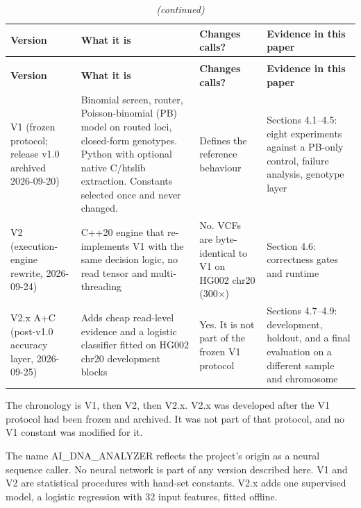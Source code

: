 \documentclass[11pt,a4paper]{article}
\begin{document}
{\footnotesize
\setlength{\tabcolsep}{3.2pt}
\begin{xltabular}{\linewidth}{>{\hsize\raggedright\arraybackslash}X>{\hsize\raggedright\arraybackslash}X>{\hsize\raggedright\arraybackslash}X>{\hsize\raggedright\arraybackslash}X}
\caption{Versions of AI\_DNA\_ANALYZER and the evidence used for each.}\\
\toprule
\textbf{Version} & \textbf{What it is} & \textbf{Changes calls?} & \textbf{Evidence in this paper} \\
\midrule
\endfirsthead
\caption[]{\textit{(continued)}}\\
\toprule
\textbf{Version} & \textbf{What it is} & \textbf{Changes calls?} & \textbf{Evidence in this paper} \\
\midrule
\endhead
V1 (frozen protocol; release v1.0 archived 2026-09-20) & Binomial screen, router, Poisson-binomial (PB) model on routed loci, closed-form genotypes. Python with optional native C/htslib extraction. Constants selected once and never changed. & Defines the reference behaviour & Sections 4.1--4.5: eight experiments against a PB-only control, failure analysis, genotype layer \\
V2 (execution-engine rewrite, 2026-09-24) & C++20 engine that re-implements V1 with the same decision logic, no read tensor and multi-threading & No. VCFs are byte-identical to V1 on HG002 chr20 (300$\times$) & Section 4.6: correctness gates and runtime \\
V2.x A+C (post-v1.0 accuracy layer, 2026-09-25) & Adds cheap read-level evidence and a logistic classifier fitted on HG002 chr20 development blocks & Yes. It is not part of the frozen V1 protocol & Sections 4.7--4.9: development, holdout, and a final evaluation on a different sample and chromosome \\
\bottomrule
\end{xltabular}
}

The chronology is V1, then V2, then V2.x. V2.x was developed after the V1 protocol had been frozen and archived. It was not part of that protocol, and no V1 constant was modified for it.

The name AI\_DNA\_ANALYZER reflects the project's origin as a neural sequence caller. No neural network is part of any version described here. V1 and V2 are statistical procedures with hand-set constants. V2.x adds one supervised model, a logistic regression with 32 input features, fitted offline.
\end{document}
